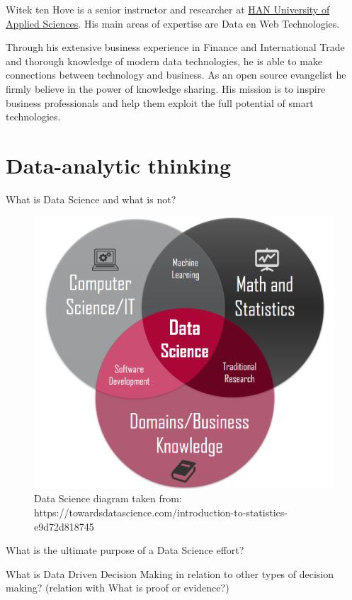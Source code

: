 \documentclass[
]{book}
\begin{document}
Witek ten Hove is a senior instructor and researcher at \href{https://hanuniversity.com/en/}{HAN University of Applied Sciences}. His main areas of expertise are Data en Web Technologies.

Through his extensive business experience in Finance and International Trade and thorough knowledge of modern data technologies, he is able to make connections between technology and business. As an open source evangelist he firmly believe in the power of knowledge sharing. His mission is to inspire business professionals and help them exploit the full potential of smart technologies.

\hypertarget{thinking}{%
\chapter{Data-analytic thinking}\label{thinking}}

What is Data Science and what is not?

\begin{figure}

{\centering \includegraphics[width=0.8\linewidth]{images/datascience} 

}

\caption{Data Science diagram taken from: https://towardsdatascience.com/introduction-to-statistics-e9d72d818745}\label{fig:datascience-fig}
\end{figure}

What is the ultimate purpose of a Data Science effort?

What is Data Driven Decision Making in relation to other types of decision making? (relation with What is proof or evidence?)
\end{document}
